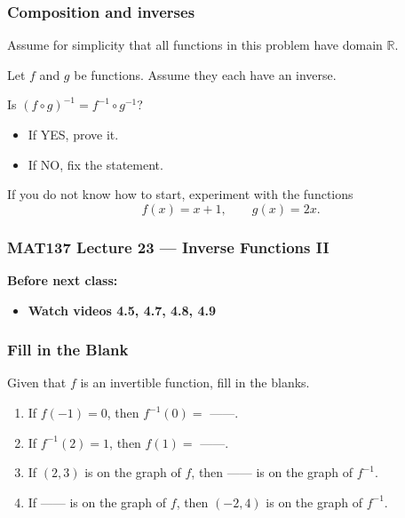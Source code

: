 \documentclass[14pt]{beamer}
\newcommand {\DS} [1] {${\displaystyle #1}$}
\newcommand {\R}{\mathbb{R}}
\newcommand{\p}{\pause}
\begin{document}
\begin{frame}[t]
\frametitle{Composition and inverses}

Assume for simplicity that all functions in this problem have domain $\R$.

\vfill

Let $f$ and $g$ be functions.  Assume they each have an inverse.

\vfill

Is \DS{\left( f \circ g \right)^{-1} = f^{-1} \circ g^{-1}}?

\begin{itemize}
	\item If YES, prove it. 
	\item If NO, fix the statement.
\end{itemize}


\vfill  \p

If you do not know how to start, experiment with the functions
	$$
		f(x) = x + 1, \quad \quad g(x) = 2x.
	$$

\end{frame}
















\begin{frame}
	\frametitle{MAT137 Lecture 23 --- Inverse Functions II}

	\vfill
	{\bf Before next class:}
		\begin{itemize} \normalsize
			\item {\bf Watch videos 4.5, 4.7, 4.8, 4.9 }
		\end{itemize}
\end{frame}


\begin{frame}
\frametitle{Fill in the Blank }

Given that $f$ is an invertible function, fill in the blanks. 
\begin{enumerate}
\item If $f(-1) = 0$, then $f^{-1}(0) =$ ------.
\item If $f^{-1}(2) = 1$, then $f(1)=$ ------.
\item If $(2,3)$ is on the graph of $f$, then ------  is on the graph of $f^{-1}$.
\item If ------ is on the graph of $f$, then $(-2,4)$ is on the graph of $f^{-1}$.
\end{enumerate}


\end{frame}
\end{document}

